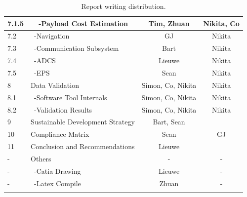 \begin{center}
\begin{longtable}{|l|l|c|c|}
 7.1.5   & \ \ -Payload Cost Estimation        & Tim, Zhuan & Nikita, Co\\\hline
 7.2   & \ -Navigation                        & GJ & Nikita\\\hline
 7.3     & \ -Communication Subsystem           & Bart & Nikita\\\hline
 7.4     & \ -ADCS                              & Lieuwe & Nikita\\\hline
 7.5     & \ -EPS                               & Sean & Nikita\\\hline\hline
 8       & Data Validation                      & Simon, Co, Nikita & Nikita \\\hline
 8.1     & \ -Software Tool Internals           & Simon, Co, Nikita & Nikita \\\hline
 8.2     & \ -Validation Results                & Simon, Co, Nikita & Nikita \\\hline\hline
 9       & Sustainable Development Strategy     &Bart, Sean & \\\hline\hline
 10      & Compliance Matrix                    & Sean & GJ \\\hline\hline
 11      & Conclusion and Recommendations       & Lieuwe &\\\hline\hline
 -       & Others                               & - & - \\\hline
 -       & \ -Catia Drawing                     & Lieuwe & -\\\hline
 -       & \ -Latex Compile                     & Zhuan & -\\\hline

\caption{Report writing distribution.}
\label{tab:RWD}
\end{longtable}
\end{center}